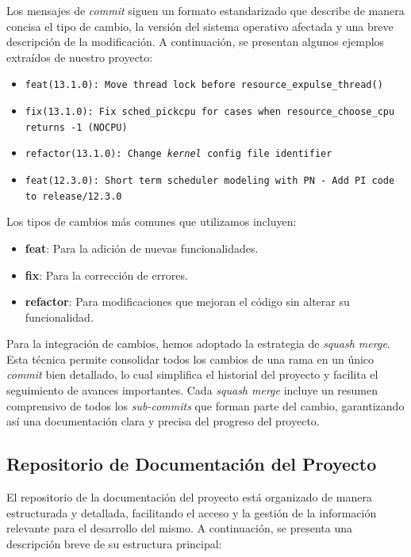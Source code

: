Los mensajes de \textit{commit} siguen un formato estandarizado que describe de manera concisa el tipo de cambio, la versión del sistema operativo afectada y una breve descripción de la modificación. A continuación, se presentan algunos ejemplos extraídos de nuestro proyecto:

\begin{itemize}
    \item \texttt{feat(13.1.0): Move thread lock before resource\_expulse\_thread()}
    \item \texttt{fix(13.1.0): Fix sched\_pickcpu for cases when resource\_choose\_cpu returns -1 (NOCPU)}
    \item \texttt{refactor(13.1.0): Change \textit{kernel} config file identifier}
    \item \texttt{feat(12.3.0): Short term scheduler modeling with PN - Add PI code to release/12.3.0}
\end{itemize}

Los tipos de cambios más comunes que utilizamos incluyen:
\begin{itemize}
    \item \textbf{feat}: Para la adición de nuevas funcionalidades.
    \item \textbf{fix}: Para la corrección de errores.
    \item \textbf{refactor}: Para modificaciones que mejoran el código sin alterar su funcionalidad.
\end{itemize}

Para la integración de cambios, hemos adoptado la estrategia de \textit{squash merge}. Esta técnica permite consolidar todos los cambios de una rama en un único \textit{commit} bien detallado, lo cual simplifica el historial del proyecto y facilita el seguimiento de avances importantes. Cada \textit{squash merge} incluye un resumen comprensivo de todos los \textit{sub-commits} que forman parte del cambio, garantizando así una documentación clara y precisa del progreso del proyecto.\par

\subsection{Repositorio de Documentación del Proyecto} \label{sect:wiki}

El repositorio de la documentación del proyecto está organizado de manera estructurada y detallada, facilitando el acceso y la gestión de la información relevante para el desarrollo del mismo. A continuación, se presenta una descripción breve de su estructura principal:

